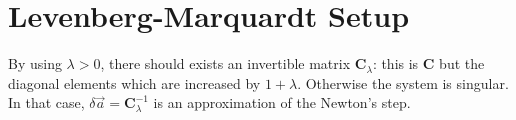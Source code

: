 \documentclass[aps,twocolumn]{revtex4}
\newcommand{\mymat}[1]{\boldsymbol{#1}}
\begin{document}
\section{Levenberg-Marquardt Setup}
By using $\lambda>0$, there should exists an invertible matrix $\mymat{C}_\lambda$: this is $\mymat{C}$ but
the diagonal elements which are increased by $1+\lambda$. Otherwise the system is singular.
In that case, $\delta\vec{a} = \mymat{C}_\lambda^{-1}$ is an approximation of
the Newton's step.
\end{document}
